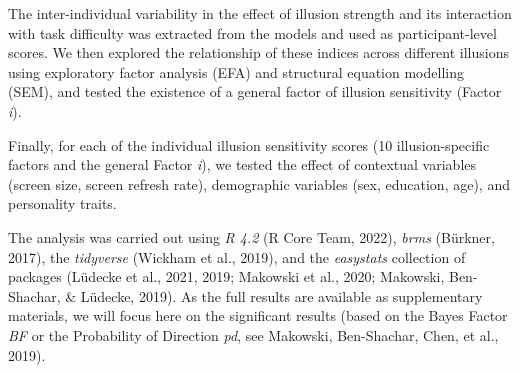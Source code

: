 \documentclass[
  man,floatsintext]{apa6}
\begin{document}
The inter-individual variability in the effect of illusion strength and its interaction with task difficulty was extracted from the models and used as participant-level scores. We then explored the relationship of these indices across different illusions using exploratory factor analysis (EFA) and structural equation modelling (SEM), and tested the existence of a general factor of illusion sensitivity (Factor \emph{i}).

Finally, for each of the individual illusion sensitivity scores (10 illusion-specific factors and the general Factor \emph{i}), we tested the effect of contextual variables (screen size, screen refresh rate), demographic variables (sex, education, age), and personality traits.

The analysis was carried out using \emph{R 4.2} (R Core Team, 2022), \emph{brms} (Bürkner, 2017), the \emph{tidyverse} (Wickham et al., 2019), and the \emph{easystats} collection of packages (Lüdecke et al., 2021, 2019; Makowski et al., 2020; Makowski, Ben-Shachar, \& Lüdecke, 2019). As the full results are available as supplementary materials, we will focus here on the significant results (based on the Bayes Factor \emph{BF} or the Probability of Direction \emph{pd}, see Makowski, Ben-Shachar, Chen, et al., 2019).
\end{document}
